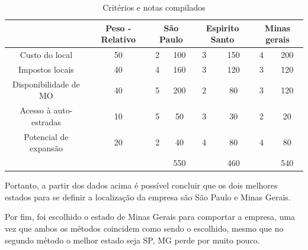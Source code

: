 \documentclass[
	12pt,				%
	openright,			%
	oneside,			%
	a4paper,			%
	english,			%
	french,				%
	spanish,			%
	brazil				%
	]{abntex2}
\begin{document}
\begin{longtable}[c]{cccc|cc|cc|}
\caption{Critérios e notas compilados}
\label{tabela 5}\\
\hline
\rowcolor[HTML]{D9D9D9} 
\multicolumn{1}{|c|}{\cellcolor[HTML]{D9D9D9}Critérios} &
  \multicolumn{1}{c|}{\cellcolor[HTML]{D9D9D9}Peso - Relativo} &
  \multicolumn{2}{c|}{\cellcolor[HTML]{D9D9D9}São Paulo} &
  \multicolumn{2}{c|}{\cellcolor[HTML]{D9D9D9}Espirito Santo} &
  \multicolumn{2}{c|}{\cellcolor[HTML]{D9D9D9}Minas gerais} \\ \hline
\endhead
%
\multicolumn{1}{|c|}{\cellcolor[HTML]{D9D9D9}Custo do local} &
  \multicolumn{1}{c|}{50} &
  \multicolumn{1}{c|}{2} &
  100 &
  \multicolumn{1}{c|}{3} &
  150 &
  \multicolumn{1}{c|}{4} &
  200 \\ \hline
\multicolumn{1}{|c|}{\cellcolor[HTML]{D9D9D9}Impostos locais} &
  \multicolumn{1}{c|}{40} &
  \multicolumn{1}{c|}{4} &
  160 &
  \multicolumn{1}{c|}{3} &
  120 &
  \multicolumn{1}{c|}{3} &
  120 \\ \hline
\multicolumn{1}{|c|}{\cellcolor[HTML]{D9D9D9}Disponibilidade de MO} &
  \multicolumn{1}{c|}{40} &
  \multicolumn{1}{c|}{5} &
  200 &
  \multicolumn{1}{c|}{2} &
  80 &
  \multicolumn{1}{c|}{3} &
  120 \\ \hline
\multicolumn{1}{|c|}{\cellcolor[HTML]{D9D9D9}Acesso à auto-estradas} &
  \multicolumn{1}{c|}{10} &
  \multicolumn{1}{c|}{5} &
  50 &
  \multicolumn{1}{c|}{3} &
  30 &
  \multicolumn{1}{c|}{2} &
  20 \\ \hline
\multicolumn{1}{|c|}{\cellcolor[HTML]{D9D9D9}Potencial de expansão} &
  \multicolumn{1}{c|}{20} &
  \multicolumn{1}{c|}{2} &
  40 &
  \multicolumn{1}{c|}{4} &
  80 &
  \multicolumn{1}{c|}{4} &
  80 \\ \hline
\multicolumn{1}{l}{} &
  \multicolumn{1}{l}{} &
  \multicolumn{1}{l|}{} &
  \cellcolor[HTML]{A0D9AF}550 &
  \multicolumn{1}{l|}{} &
  \cellcolor[HTML]{EFEFEF}460 &
  \multicolumn{1}{l|}{} &
  \cellcolor[HTML]{EFEFEF}540 \\ \cline{4-4} \cline{6-6} \cline{8-8} 
\end{longtable}

Portanto, a partir dos dados acima é possível concluir que os dois melhores estados para se definir a localização da empresa são São Paulo e Minas Gerais.

Por fim, foi escolhido o estado de Minas Gerais para comportar a empresa, uma vez que ambos os métodos coincidem como sendo o escolhido, mesmo que no segundo método o melhor estado seja SP, MG perde por muito pouco.
\end{document}
